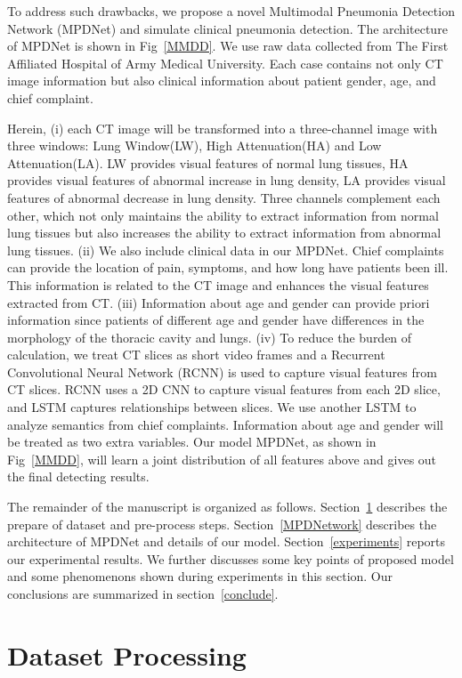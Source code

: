 \documentclass[journal]{IEEEtran}
\begin{document}
To address such drawbacks, we propose a novel Multimodal Pneumonia Detection Network (MPDNet) and simulate clinical pneumonia detection. The architecture of MPDNet is shown in Fig~\ref{MMDD}. We use raw data collected from The First Affiliated Hospital of Army Medical University. Each case contains not only CT image information but also clinical information about patient gender, age, and chief complaint. 

Herein, (i) each CT image will be transformed into a three-channel image with three windows: Lung Window(LW), High Attenuation(HA) and Low Attenuation(LA). LW provides visual features of normal lung tissues, HA provides visual features of abnormal increase in lung density, LA provides visual features of abnormal decrease in lung density. Three channels complement each other, which not only maintains the ability to extract information from normal lung tissues but also increases the ability to extract information from abnormal lung tissues.
(ii) We also include clinical data in our MPDNet. Chief complaints can provide the location of pain, symptoms, and how long have patients been ill. This information is related to the CT image and enhances the visual features extracted from CT. (iii) Information about age and gender can provide priori information since patients of different age and gender have differences in the morphology of the thoracic cavity and lungs. (iv) To reduce the burden of calculation, we treat CT slices as short video frames and a Recurrent Convolutional Neural Network (RCNN) is used to capture visual features from CT slices. RCNN uses a 2D CNN to capture visual features from each 2D slice, and LSTM captures relationships between slices. We use another LSTM to analyze semantics from chief complaints. Information about age and gender will be treated as two extra variables. Our model MPDNet, as shown in Fig~\ref{MMDD}, will learn a joint distribution of all features above and gives out the final detecting results.

The remainder of the manuscript is organized as follows. 
Section~\ref{datasetprocessing} describes the prepare of dataset and pre-process steps.
Section~\ref{MPDNetwork} describes the architecture of MPDNet and details of our model.
Section~\ref{experiments} reports our experimental results. We further discusses some key points of proposed model and some phenomenons shown during experiments in this section.
Our conclusions are summarized in section~\ref{conclude}.


\section{Dataset Processing}
\label{datasetprocessing}
\end{document}
